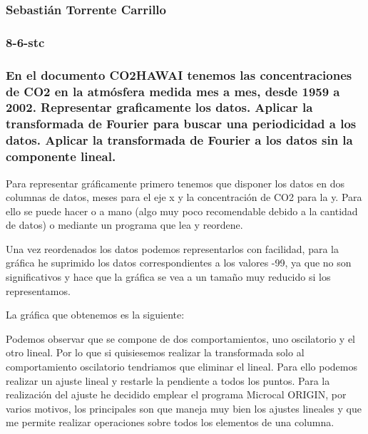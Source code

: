 \documentclass[12pt,thmsa]{article}
\begin{document}
\subsubsection{\protect\vspace{1pt}Sebasti\'{a}n Torrente Carrillo}

\subsubsection{8-6-stc}

\subsubsection{\protect\vspace{1pt}En el documento CO2HAWAI tenemos las
concentraciones de CO2 en la atm\'{o}sfera medida mes a mes, desde 1959 a
2002. Representar graficamente los datos. Aplicar la transformada de Fourier
para buscar una periodicidad a los datos. Aplicar la transformada de Fourier
a los datos sin la componente lineal.}

Para representar gr\'{a}ficamente primero tenemos que disponer los datos en
dos columnas de datos, meses para el eje x y la concentraci\'{o}n de CO2
para la y. Para ello se puede hacer o a mano (algo muy poco recomendable
debido a la cantidad de datos) o mediante un programa que lea y reordene.

Una vez reordenados los datos podemos representarlos con facilidad, para la
gr\'{a}fica he suprimido los datos correspondientes a los valores -99, ya
que no son significativos y hace que la gr\'{a}fica se vea a un tama\~{n}o
muy reducido si los representamos.

La gr\'{a}fica que obtenemos es la siguiente:


Podemos observar que se compone de dos comportamientos, uno oscilatorio y el
otro lineal. Por lo que si quisiesemos realizar la transformada solo al
comportamiento oscilatorio tendriamos que eliminar el lineal. Para ello
podemos realizar un ajuste lineal y restarle la pendiente a todos los
puntos. Para la realizaci\'{o}n del ajuste he decidido emplear el programa
Microcal ORIGIN, por varios motivos, los principales son que maneja muy bien
los ajustes lineales y que me permite realizar operaciones sobre todos los
elementos de una columna.
\end{document}
